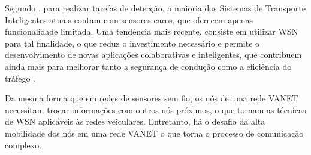 \documentclass[
	12pt,				%
	oneside,			%
	a4paper,			%
	english,			%
	brazil				%
	]{abntex2ppgsi}
\begin{document}
Segundo , para realizar tarefas de detecção, a maioria dos Sistemas de Transporte Inteligentes atuais contam com sensores caros, que oferecem apenas funcionalidade limitada. Uma tendência mais recente, consiste em utilizar WSN para tal finalidade, o que reduz o investimento necessário e permite o desenvolvimento de novas aplicações colaborativas e inteligentes, que contribuem ainda mais para melhorar tanto a segurança de condução como a eficiência do tráfego \cite{losilla2011comprehensive}.

Da mesma forma que em redes de sensores sem fio, os nós de uma rede VANET necessitam trocar informações com outros nós próximos, o que tornam as técnicas de WSN aplicáveis às redes veiculares. Entretanto, há o desafio da alta mobilidade dos nós em uma rede VANET o que torna o processo de comunicação complexo.



\end{document}
